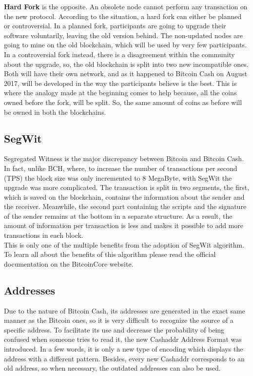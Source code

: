 \textbf{Hard Fork}
is the opposite. An obsolete node cannot perform any transaction on the new protocol.
According to the situation, a hard fork can either be planned or controversial.
In a planned fork, participants are going to upgrade their software voluntarily,
leaving the old version behind. The non-updated nodes are going to mine on the old 
blockchain, which will be used by very few participants.\\
In a controversial fork instead, there is a disagreement within the community about
the upgrade, so, the old blockchain is split into two new incompatible ones.\\ 
Both will have their own network, and as it happened to Bitcoin Cash on August 2017, 
will be developed in the way the participants believe is the best. This is where 
the analogy made at the beginning comes to help because, all the coins owned before 
the fork, will be split. So, the same amount of coins as before will be owned in 
both the blockchains.\cite{binancevision}\pagebreak


\subsection{SegWit}
\label{sec:segwit}

Segregated Witness is the major discrepancy between Bitcoin and Bitcoin Cash. In fact,
unlike BCH, where, to increase the number of transactions per second (TPS)
the block size was only incremented to 8 MegaByte, with SegWit the upgrade was more 
complicated. The transaction is split in two segments, the first, which is saved 
on the blockchain, contains the information about the sender and the receiver. 
Meanwhile, the second part containing the scripts and the signature of the sender remains at the 
bottom in a separate structure. As a result, the amount of information per transaction
is less and makes it possible to add more transactions in each block.\\
This is only one of the multiple benefits from the adoption of SegWit 
algorithm. To learn all about the benefits of this algorithm please read the official
documentation on the BitcoinCore website\cite{bitcoincore}.

\subsection{Addresses}
\label{sec:addresses}

Due to the nature of Bitcoin Cash, its addresses are generated in the exact same 
manner as the Bitcoin ones, so it is very difficult to recognize the source of 
a specific address. To facilitate its use and decrease the probability of being 
confused when someone tries to read it, the new Cashaddr Address 
Format was introduced. In a few words, it is only a new type of encoding which displays the 
address with a different pattern. Besides, every new Cashaddr corresponds to 
an old address, so when necessary, the outdated addresses can also be used.

